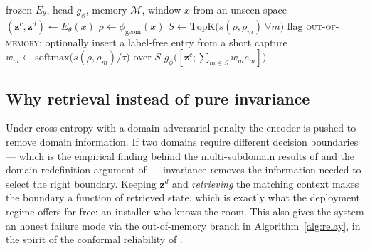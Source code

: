 \documentclass[conference]{IEEEtran}
\newcommand{\method}{\textsc{Relay}}
\newcommand{\zc}{\mathbf{z}^{c}}      %
\newcommand{\zd}{\mathbf{z}^{d}}      %
\begin{document}
\begin{algorithm}[!ht]
\caption{\method{} inference (adaptation = memory insertion, no retraining)}
\label{alg:relay}
\begin{algorithmic}[1]
\Require frozen $E_\theta$, head $g_\phi$, memory $\mathcal{M}$, window $x$ from an unseen space
\State $(\zc, \zd) \gets E_\theta(x)$
\State $\rho \gets \phi_{\mathrm{geom}}(x)$
\State $S \gets \mathrm{TopK}\big(s(\rho,\rho_m)\ \forall m\big)$
                       
    \State flag \textsc{out-of-memory}; optionally insert a label-free entry from a short capture
\EndIf
\State $w_m \gets \mathrm{softmax}\big(s(\rho,\rho_m)/\tau\big)$ over $S$
\State \Return $g_\phi\big([\zc; \textstyle\sum_{m\in S} w_m e_m]\big)$
\end{algorithmic}
\end{algorithm}

\subsection{Why retrieval instead of pure invariance}
Under cross-entropy with a domain-adversarial penalty the encoder is pushed to remove
domain information. If two domains require different decision boundaries --- which is the
empirical finding behind the multi-subdomain results of \cite{Liu2024WiSGP} and the
domain-redefinition argument of \cite{Zhang2026BeyondLabels} --- invariance removes the
information needed to select the right boundary. Keeping $\zd$ and \emph{retrieving} the
matching context makes the boundary a function of retrieved state, which is exactly what
the deployment regime offers for free: an installer who knows the room. This also gives the
system an honest failure mode via the out-of-memory branch in
Algorithm~\ref{alg:relay}, in the spirit of the conformal reliability of
\cite{Li2026Conformal}.




\end{document}

